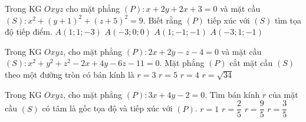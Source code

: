 \begin{ex}%
	Trong KG $Oxyz$ cho mặt phẳng $(P)\colon x+2y+2x+3=0$ và mặt cầu $(S)\colon x^2+(y+1)^2+(z+5)^2=9$. Biết rằng $(P)$ tiếp xúc với $(S)$ tìm tọa độ tiếp điểm.
	\choice
	{\True $A(1;1;-3)$}
	{$A(-3;0;0)$}
	{$A(1;-1;-1)$}
	{$A(-3;1;-1)$}
\end{ex}
\begin{ex}%
	Trong KG $Oxyz$, cho mặt phẳng $(P)\colon 2x+2y-z-4=0$ và mặt cầu $(S)\colon x^2+y^2+z^2-2x+4y-6z-11=0$. Mặt phẳng $(P)$ cắt mặt cầu $(S)$ theo một đường tròn có bán kính là
	\choice
	{$r=3$}
	{$r=5$}
	{\True $r=4$}
	{$r=\sqrt{34}$}
\end{ex}
\begin{ex}%
	Trong KG $Oxyz$, cho mặt phẳng $(P)\colon 3x+4y-2=0$. Tìm bán kính $r$ của mặt cầu $(S)$ có tâm là gốc tọa độ và tiếp xúc với $(P)$.
	\choice
	{$r=1$}
	{\True $r=\dfrac{2}{5}$}
	{$r=\dfrac{9}{5}$}
	{$r=\dfrac{3}{5}$}
\end{ex}


